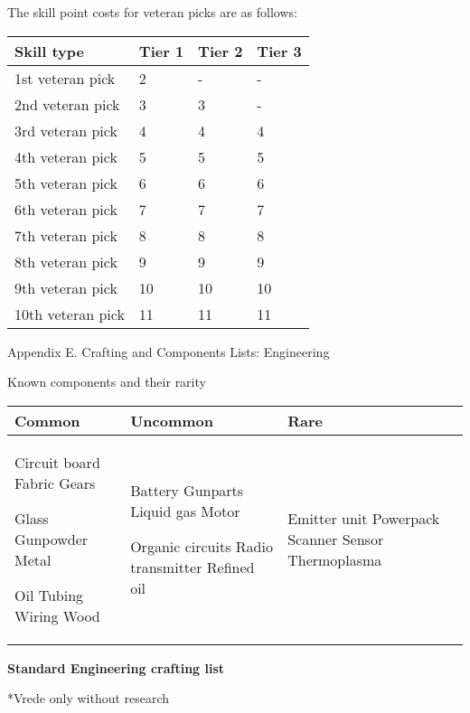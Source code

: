 \documentclass{scrbook}
\begin{document}
The skill point costs for veteran picks are as follows:

\begin{table}
\begin{tabular}{|l|l|l|l|} \hline 
Skill type & Tier 1 & Tier 2 & Tier 3 \\
 \hline 1st veteran pick & 2 & - & - \\
 \hline 2nd veteran pick & 3 & 3 & - \\
 \hline 3rd veteran pick & 4 & 4 & 4 \\
 \hline 4th veteran pick & 5 & 5 & 5 \\
 \hline 5th veteran pick & 6 & 6 & 6 \\
 \hline 6th veteran pick & 7 & 7 & 7 \\
 \hline 7th veteran pick & 8 & 8 & 8 \\
 \hline 8th veteran pick & 9 & 9 & 9 \\
 \hline 9th veteran pick & 10 & 10 & 10 \\
 \hline 10th veteran pick & 11 & 11 & 11 \\
 \hline \end{tabular}

\end{table}

Appendix E. Crafting and Components Lists: Engineering

Known components and their rarity

\begin{table}
\begin{tabular}{|l|l|l|} \hline 
Common & Uncommon & Rare \\
 \hline Circuit board Fabric Gears\par Glass Gunpowder Metal\par Oil Tubing Wiring Wood & Battery Gunparts Liquid gas Motor\par Organic circuits Radio transmitter Refined oil & Emitter unit Powerpack Scanner Sensor Thermoplasma \\
 \hline \end{tabular}

\end{table}

\textbf{Standard Engineering crafting list}

*Vrede only without research
\end{document}
